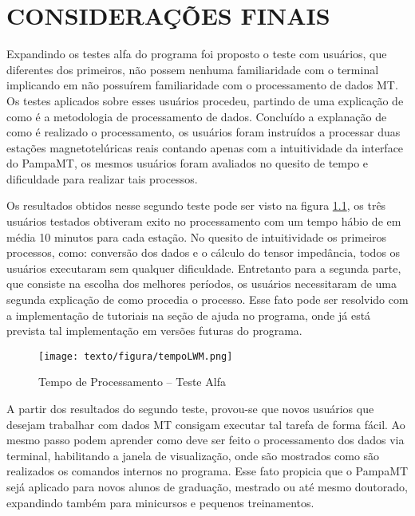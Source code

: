 \chapter{CONSIDERAÇÕES FINAIS}
    
    Expandindo os testes alfa do programa foi proposto o teste com usuários, que diferentes dos primeiros, não possem nenhuma familiaridade com o terminal  implicando em não possuírem familiaridade com o processamento de dados MT. Os testes aplicados sobre esses usuários procedeu, partindo de uma explicação de como é a metodologia de processamento de dados. Concluído a explanação de como é realizado o processamento, os usuários foram instruídos a processar duas estações magnetotelúricas reais contando apenas com a intuitividade da interface do PampaMT, os mesmos usuários foram avaliados no quesito de tempo e dificuldade para realizar tais processos.
    
    Os resultados obtidos nesse segundo teste pode ser visto na figura \ref{teste1}, os três usuários testados obtiveram exito no processamento com um tempo hábio de em média 10 minutos para cada estação. No quesito de intuitividade os primeiros processos, como: conversão dos dados e o cálculo do tensor impedância, todos os usuários executaram sem qualquer dificuldade. Entretanto para a segunda parte, que consiste na escolha dos melhores períodos, os usuários necessitaram de uma segunda explicação de como procedia o processo. Esse fato pode ser resolvido com a implementação de tutoriais na seção de ajuda no programa, onde já está prevista tal implementação em versões futuras do programa.     
    
    \begin{figure}[H]
        \caption{Tempo de Processamento -- Teste Alfa}
            \begin{center}
                \texttt{[image: texto/figura/tempoLWM.png]}
            \end{center}
        \label{teste1}
    \end{figure}
    
    A partir dos resultados do segundo teste, provou-se que novos usuários que desejam trabalhar com dados MT consigam executar tal tarefa de forma fácil. Ao mesmo passo podem aprender como deve ser feito o processamento dos dados via terminal, habilitando a janela de visualização, onde são mostrados como são realizados os comandos internos no programa. Esse fato propicia que o PampaMT sejá aplicado para novos alunos de graduação, mestrado ou até mesmo doutorado, expandindo também para minicursos e pequenos treinamentos.
    
